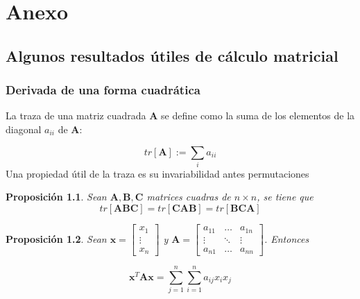 \documentclass[12pt, twoside]{book}\usepackage[]{graphicx}\usepackage[]{color}
\numberwithin{equation}{section}
\numberwithin{theorem}{section}
\newtheorem{teorema}{Proposición}
\numberwithin{teorema}{section}
\numberwithin{defi}{section}
\numberwithin{prop}{section}
\numberwithin{defi}{section}
\theoremstyle{plain}
\begin{document}
  
\chapter{Anexo}
\section{Algunos resultados útiles de cálculo matricial}

\subsection{Derivada de una forma cuadrática}
La traza de una matriz cuadrada $\mathbf{A}$ se define como la suma de los elementos de la diagonal $a_{ii}$ de $\mathbf{A}$: 

\begin{equation}
tr[\mathbf{A}]:= \sum_{i}a_{ii}
\end{equation}
Una propiedad útil de la traza es su invariabilidad antes permutaciones

\begin{teorema}
Sean $\mathbf{A,B,C}$ matrices cuadras de $n\times n$, se tiene que
\begin{equation}
tr[\mathbf{ABC}] = tr[\mathbf{CAB}] = tr[\mathbf{BCA}]
\end{equation}
\end{teorema}

\begin{teorema}
Sean $\mathbf{x} = \left[\begin{array}{c} x_{1} \\ \vdots \\ x_{n} \end{array}\right]$ y $\mathbf{A} =
\left[\begin{array}{ccc}
a_{11} & \hdots & a_{1n} \\ 
\vdots & \ddots & \vdots \\ 
a_{n1} & \hdots & a_{nn}
\end{array}\right]$. Entonces

\begin{equation}
\mathbf{x}^{T}\mathbf{Ax} = \sum_{j=1}^{n}\sum_{i=1}^{n}a_{ij}x_{i}x_{j}
\end{equation}
\end{teorema}
\end{document}
